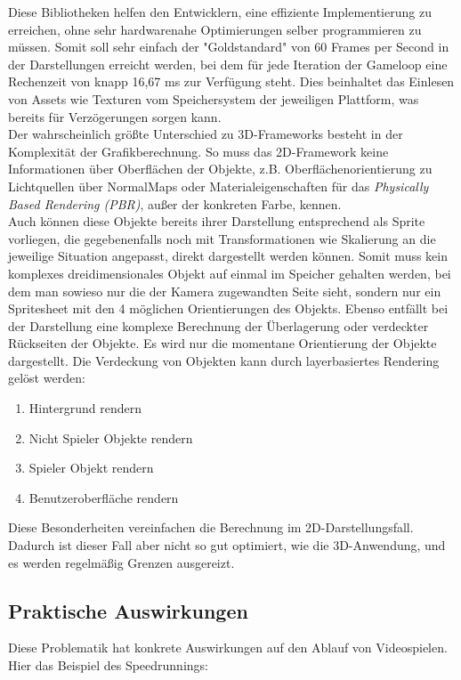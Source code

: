 Diese Bibliotheken helfen den Entwicklern, eine effiziente Implementierung zu erreichen, ohne sehr hardwarenahe Optimierungen selber programmieren zu müssen. Somit soll sehr einfach der "Goldstandard" von 60 Frames per Second in der Darstellungen erreicht werden, bei dem für jede Iteration der Gameloop eine Rechenzeit von knapp 16,67 ms zur Verfügung steht. Dies beinhaltet das Einlesen von Assets wie Texturen vom Speichersystem der jeweiligen Plattform, was bereits für Verzögerungen sorgen kann.\\ 
Der wahrscheinlich größte Unterschied zu 3D-Frameworks besteht in der Komplexität der Grafikberechnung. So muss das 2D-Framework keine Informationen über Oberflächen der Objekte, z.B. Oberflächenorientierung zu Lichtquellen über NormalMaps oder Materialeigenschaften für das \emph{Physically Based Rendering (PBR)}, außer der konkreten Farbe, kennen.\\
Auch können diese Objekte bereits ihrer Darstellung entsprechend als Sprite vorliegen, die gegebenenfalls noch mit Transformationen wie Skalierung an die jeweilige Situation  angepasst, direkt dargestellt werden können. Somit muss kein komplexes dreidimensionales Objekt auf einmal im Speicher gehalten werden, bei dem man sowieso nur die der Kamera zugewandten Seite sieht, sondern nur ein Spritesheet mit den 4 möglichen Orientierungen des Objekts.
Ebenso entfällt bei der Darstellung eine komplexe Berechnung der Überlagerung oder verdeckter Rückseiten der Objekte. Es wird nur die momentane Orientierung der Objekte dargestellt. Die Verdeckung von Objekten kann durch layerbasiertes Rendering gelöst werden:
\begin{enumerate}
\item Hintergrund rendern\\
\item Nicht Spieler Objekte rendern\\
\item Spieler Objekt rendern\\
\item Benutzeroberfläche rendern\\
\end{enumerate}
Diese Besonderheiten vereinfachen die Berechnung im 2D-Darstellungsfall. Dadurch ist dieser Fall aber nicht so gut optimiert, wie die 3D-Anwendung, und es werden regelmäßig Grenzen ausgereizt.

\subsection{Praktische Auswirkungen}
Diese Problematik hat konkrete Auswirkungen auf den Ablauf von Videospielen. Hier das Beispiel des Speedrunnings:


